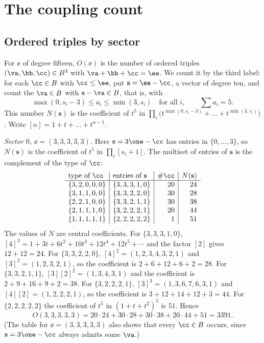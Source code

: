 \section{The coupling count}\label{app:count}

\subsection{Ordered triples by sector}

For $\ee$ of degree fifteen, $O(\ee)$ is the number of ordered triples
$(\va,\bb,\cc)\in B^3$ with $\va+\bb+\cc=\ee$. We count it by the third
label: for each $\cc\in B$ with $\cc\le\ee$, put $\mathbf s=\ee-\cc$, a
vector of degree ten, and count the $\va\in B$ with $\mathbf s-\va\in B$,
that is, with
\[
\max(0,s_i-3)\le a_i\le\min(3,s_i)\quad\text{for all }i,\qquad
\textstyle\sum a_i=5.
\]
This number $N(\mathbf s)$ is the coefficient of $t^5$ in
$\prod_i\big(t^{\max(0,s_i-3)}+\dots+t^{\min(3,s_i)}\big)$. Write
$[n]=1+t+\dots+t^{n-1}$.

\emph{Sector $0$, $\ee=(3,3,3,3,3)$.} Here $\mathbf s=3\one-\cc$ has
entries in $\{0,\dots,3\}$, so $N(\mathbf s)$ is the coefficient of $t^5$ in
$\prod_i[s_i+1]$. The multiset of entries of $\mathbf s$ is the complement
of the type of $\cc$:
\[
\begin{array}{l|l|r|r}
\text{type of }\cc&\text{entries of }\mathbf s&\#\cc&N(\mathbf s)\\\hline
\{3,2,0,0,0\}&\{3,3,3,1,0\}&20&24\\
\{3,1,1,0,0\}&\{3,3,2,2,0\}&30&28\\
\{2,2,1,0,0\}&\{3,3,2,1,1\}&30&38\\
\{2,1,1,1,0\}&\{3,2,2,2,1\}&20&44\\
\{1,1,1,1,1\}&\{2,2,2,2,2\}&1&51
\end{array}
\]
The values of $N$ are central coefficients. For $\{3,3,3,1,0\}$,
$[4]^3=1+3t+6t^2+10t^3+12t^4+12t^5+\cdots$ and the factor $[2]$ gives
$12+12=24$. For $\{3,3,2,2,0\}$, $[4]^2=(1,2,3,4,3,2,1)$ and
$[3]^2=(1,2,3,2,1)$, so the coefficient is $2+6+12+6+2=28$. For
$\{3,3,2,1,1\}$, $[3][2]^2=(1,3,4,3,1)$ and the coefficient is
$2+9+16+9+2=38$. For $\{3,2,2,2,1\}$, $[3]^3=(1,3,6,7,6,3,1)$ and
$[4][2]=(1,2,2,2,1)$, so the coefficient is $3+12+14+12+3=44$. For
$\{2,2,2,2,2\}$ the coefficient of $t^5$ in $(1+t+t^2)^5$ is $51$. Hence
\[
O(3,3,3,3,3)=20\cdot24+30\cdot28+30\cdot38+20\cdot44+51=3391.
\]
(The table for $\ee=(3,3,3,3,3)$ also shows that every $\cc\in B$ occurs,
since $\mathbf s=3\one-\cc$ always admits some $\va$.)


